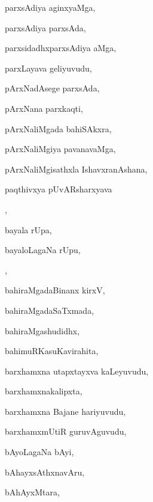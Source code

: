 \begin{multicols}{3}
{\noindent
{parxsAdiya aginxyaMga}, \pageref{parxsAdiya aginxyaMga}

\noindent
{parxsAdiya parxsAda}, \pageref{parxsAdiya parxsAda}

\noindent
{parxsidadhxparxsAdiya aMga}, \pageref{parxsidadhxparxsAdiya aMga}

\noindent
{parxLayava geliyuvudu}, \pageref{parxLayava geliyuvudu}

\noindent
{pArxNadAsege parxsAda}, \pageref{pArxNadAsege parxsAda}

\noindent
{pArxNana parxkaqti}, \pageref{pArxNana parxkaqti}

\noindent
{pArxNaliMgada bahiSAkxra}, \pageref{pArxNaliMgada bahiSAkxra}

\noindent
{pArxNaliMgiya pavanavaMga}, \pageref{pArxNaliMgiya pavanavaMga}

\noindent
{pArxNaliMgisathxla IshavxranAshana}, \pageref{pArxNaliMgisathxla IshavxranAshana}

\noindent
{paqthivxya pUvARsharxyava}

\noindent
{}, \pageref{paqthivxya pUvARsharxyava kaLeyuvudu}

\noindent
{bayala rUpa}, \pageref{bayala rUpa}

\noindent
{bayaloLagaNa rUpu,}

\noindent
{}, \pageref{bayaloLagaNa rUpu, rUpinoLagaNa bayalu}

\noindent
{bahiraMgadaBinanx kirxV}, \pageref{bahiraMgadaBinanx kirxV}

\noindent
{bahiraMgadaSaTxmada}, \pageref{bahiraMgadaSaTxmada}

\noindent
{bahiraMgashudidhx}, \pageref{bahiraMgashudidhx}

\noindent
{bahimuRKasuKavirahita}, \pageref{bahimuRKasuKavirahita}

\noindent
{barxhamxna utapxtayxva kaLeyuvudu}, \pageref{barxhamxna utapxtayxva kaLeyuvudu}

\noindent
{barxhamxnakalipxta}, \pageref{barxhamxnakalipxta}

\noindent
{barxhamxna Bajane hariyuvudu}, \pageref{barxhamxna Bajane hariyuvudu}

\noindent
{barxhamxmUtiR guruvAguvudu}, \pageref{barxhamxmUtiR guruvAguvudu}

\noindent
{bAyoLagaNa bAyi}, \pageref{bAyoLagaNa bAyi}

\noindent
{bAhayxsAthxnavAru}, \pageref{bAhayxsAthxnavAru}

\noindent
{bAhAyxMtara}, \pageref{bAhAyxMtara}

}
\end{multicols}
